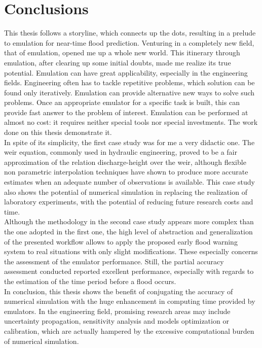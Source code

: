 \chapter{Conclusions}
\label{chp:outlook}



This thesis follows a storyline, which connects up the dots, resulting in a prelude to emulation for near-time flood prediction.
Venturing in a completely new field, that of emulation, opened me up a whole new world.
This itinerary through emulation, after clearing up some initial doubts, made me realize its true potential.
Emulation can have great applicability, especially in the engineering fields.
Engineering often has to tackle repetitive problems, which solution can be found only iteratively.
Emulation can provide alternative new ways to solve such problems.
Once an appropriate emulator for a specific task is built, this can provide fast answer to the problem of interest.
Emulation can be performed at almost no cost: it requires neither special tools nor special investments.
The work done on this thesis demonstrate it.\\

In spite of its simplicity, the first case study was for me a very didactic one.
The weir equation, commonly used in hydraulic engineering, proved to be a fair approximation of the relation discharge-height over the weir, although flexible non parametric interpolation techniques have shown to produce more accurate estimates when an adequate number of observations is available.
This case study also shows the potential of numerical simulation in replacing the realization of laboratory experiments, with the potential of reducing future research costs and time.\\

Although the methodology in the second case study appears more complex than the one adopted in the first one, the high level of abstraction and generalization of the presented workflow allows to apply the proposed early flood warning system to real situations with only slight modifications. These especially concerns the assessment of the emulator performance. Still, the partial accuracy assessment conducted reported excellent performance, especially with regards to the estimation of the time period before a flood occurs. \\

In conclusion, this thesis shows the benefit of conjugating the accuracy of numerical simulation with the huge enhancement in computing time provided by emulators. In the engineering field, promising research areas may include uncertainty propagation, sensitivity analysis and models optimization or calibration, which are actually hampered by the excessive computational burden of numerical simulation. 
